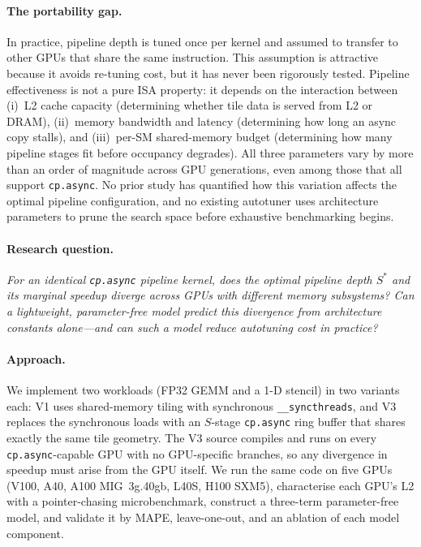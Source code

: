 \documentclass[10pt,twocolumn]{article}
\newcommand{\cpasync}{\texttt{cp.async}}
\begin{document}
\paragraph{The portability gap.}
In practice, pipeline depth is tuned once per kernel and assumed to
transfer to other GPUs that share the same instruction.  This
assumption is attractive because it avoids re-tuning cost, but it
has never been rigorously tested.  Pipeline effectiveness is not a
pure ISA property: it depends on the interaction between (i)~L2
cache capacity (determining whether tile data is served from L2 or
DRAM), (ii)~memory bandwidth and latency (determining how long an
async copy stalls), and (iii)~per-SM shared-memory budget
(determining how many pipeline stages fit before occupancy
degrades).  All three parameters vary by more than an order of
magnitude across GPU generations, even among those that all support
\cpasync{}.  No prior study has quantified how this variation
affects the optimal pipeline configuration, and no existing
autotuner uses architecture parameters to prune the search space
before exhaustive benchmarking begins.

\paragraph{Research question.}
\emph{For an identical \cpasync{} pipeline kernel, does the optimal
pipeline depth $S^*$ and its marginal speedup diverge across GPUs
with different memory subsystems?  Can a lightweight, parameter-free
model predict this divergence from architecture constants
alone---and can such a model reduce autotuning cost in practice?}

\paragraph{Approach.}
We implement two workloads (FP32 GEMM and a 1-D stencil) in two
variants each: V1 uses shared-memory tiling with synchronous
\texttt{\_\_syncthreads}, and V3 replaces the synchronous loads with
an $S$-stage \cpasync{} ring buffer that shares exactly the same
tile geometry.  The V3 source compiles and runs on every
\cpasync{}-capable GPU with no GPU-specific branches, so any
divergence in speedup must arise from the GPU itself.  We run the
same code on five GPUs (V100, A40, A100 MIG~3g.40gb, L40S, H100
SXM5), characterise each GPU's L2 with a pointer-chasing
microbenchmark, construct a three-term parameter-free model, and
validate it by MAPE, leave-one-out, and an ablation of each model
component.
\end{document}
